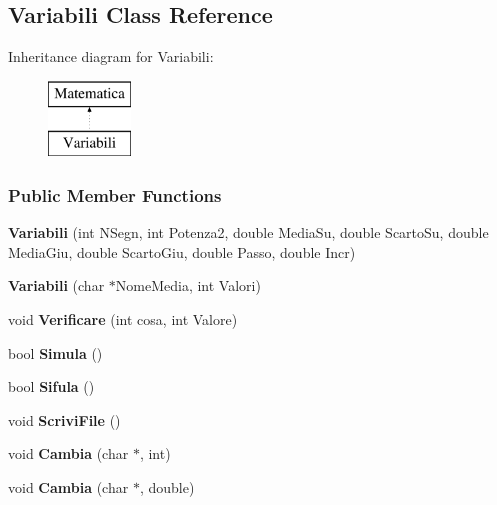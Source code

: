 \hypertarget{classVariabili}{}\subsection{Variabili Class Reference}
\label{classVariabili}
Inheritance diagram for Variabili\+:\begin{figure}[H]
\begin{center}
\leavevmode
\includegraphics[height=2.000000cm]{classVariabili}
\end{center}
\end{figure}
\subsubsection*{Public Member Functions}
\begin{DoxyCompactItemize}
\item 
{\bfseries Variabili} (int N\+Segn, int Potenza2, double Media\+Su, double Scarto\+Su, double Media\+Giu, double Scarto\+Giu, double Passo, double Incr)\hypertarget{classVariabili_af881fc3fcaf007a6ad92298c943be1e1}{}\label{classVariabili_af881fc3fcaf007a6ad92298c943be1e1}

\item 
{\bfseries Variabili} (char $\ast$Nome\+Media, int Valori)\hypertarget{classVariabili_a7d700d7f563966a19f9016ba03a9ff5c}{}\label{classVariabili_a7d700d7f563966a19f9016ba03a9ff5c}

\item 
void {\bfseries Verificare} (int cosa, int Valore)\hypertarget{classVariabili_aee1c6ef09b1a59200ab17589402e5813}{}\label{classVariabili_aee1c6ef09b1a59200ab17589402e5813}

\item 
bool {\bfseries Simula} ()\hypertarget{classVariabili_a481b4c571a6e13c411f1564d1fa59322}{}\label{classVariabili_a481b4c571a6e13c411f1564d1fa59322}

\item 
bool {\bfseries Sifula} ()\hypertarget{classVariabili_a0a9d83bb6daab4ecf2b7d88109cbf117}{}\label{classVariabili_a0a9d83bb6daab4ecf2b7d88109cbf117}

\item 
void {\bfseries Scrivi\+File} ()\hypertarget{classVariabili_aa49dc238fd7a5356a4ff0f33505fd176}{}\label{classVariabili_aa49dc238fd7a5356a4ff0f33505fd176}

\item 
void {\bfseries Cambia} (char $\ast$, int)\hypertarget{classVariabili_a8966d84a169a5ae5f2fb4e4dff78d688}{}\label{classVariabili_a8966d84a169a5ae5f2fb4e4dff78d688}

\item 
void {\bfseries Cambia} (char $\ast$, double)\hypertarget{classVariabili_a2f097ce8803ddd5d4d36b59e6b8dbb37}{}\label{classVariabili_a2f097ce8803ddd5d4d36b59e6b8dbb37}

\end{DoxyCompactItemize}
